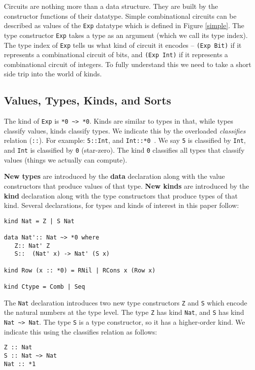 \documentclass[10pt,twoside]{article}
\begin{document}
Circuits are nothing more than a data structure. They are built
by the constructor functions of their datatype. Simple combinational
circuits can be described as values of the {\tt Exp}
datatype which is defined in Figure \ref{simple}. The type constructor
{\tt Exp} takes a type as an argument (which we call its type index). 
The type index of {\tt Exp} tells us what kind of circuit it encodes --
{\tt (Exp Bit)} if it represents a combinational circuit of bits,
and {\tt (Exp Int)} if it represents a combinational circuit of integers.
To fully understand this we need to take a short side trip into the
world of kinds.

\subsection{Values, Types, Kinds, and Sorts}


The kind of {\tt Exp} is \verb+*0 ~> *0+.
Kinds are similar to types in that, while types classify values, kinds classify
types. We indicate this by the overloaded {\em classifies} relation ({\tt ::}). For example:
{\tt 5::Int}, and {\tt Int::*0 }. We say {\tt 5} is classified by {\tt Int}, and {\tt Int}
is classified by {\tt *0} (star-zero). The kind {\tt *0} classifies all
types that classify values (things we actually can compute).

{\bf New types} are introduced by the {\bf data} declaration along with the
value constructors that produce values of that type. {\bf New kinds}
are introduced by the {\bf kind} declaration along with the
type constructors that produce types of that kind. Several declarations,
for types and kinds of interest in this paper follow:
\begin{verbatim}
kind Nat = Z | S Nat

data Nat':: Nat ~> *0 where
   Z:: Nat' Z 
   S::  (Nat' x) -> Nat' (S x)

kind Row (x :: *0) = RNil | RCons x (Row x)

kind Ctype = Comb | Seq 
\end{verbatim}

The {\tt Nat} declaration introduces two new
type constructors {\tt Z} and {\tt S} which encode the natural
numbers at the type level.
The type {\tt Z} has kind {\tt Nat}, and {\tt S} has kind {\tt Nat \verb+~+>
Nat}. The type {\tt S} is a type constructor, so it has a higher-order kind. We
indicate this using the classifies relation as follows:
\begin{verbatim}
Z :: Nat
S :: Nat ~> Nat
Nat :: *1
\end{verbatim}
\end{document}
